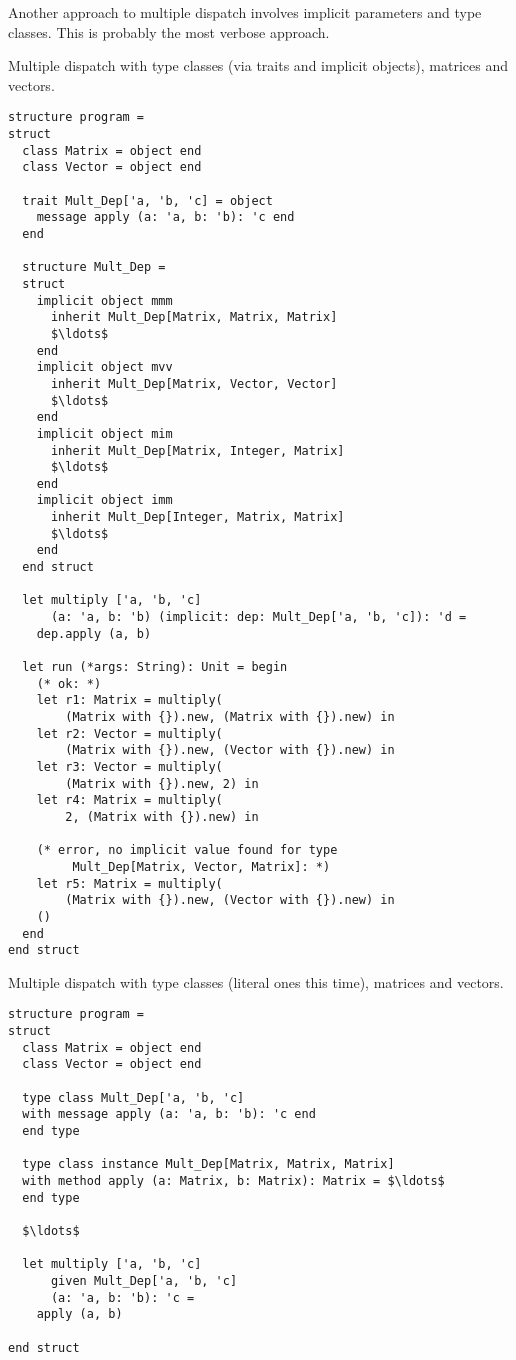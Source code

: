 Another approach to multiple dispatch involves implicit parameters and type classes. This is probably the most verbose approach. 

\example Multiple dispatch with type classes (via traits and implicit objects), matrices and vectors. 
\begin{lstlisting}
structure program =
struct
  class Matrix = object end
  class Vector = object end
  
  trait Mult_Dep['a, 'b, 'c] = object
    message apply (a: 'a, b: 'b): 'c end
  end
  
  structure Mult_Dep =
  struct
    implicit object mmm 
      inherit Mult_Dep[Matrix, Matrix, Matrix] 
      $\ldots$
    end
    implicit object mvv 
      inherit Mult_Dep[Matrix, Vector, Vector] 
      $\ldots$
    end
    implicit object mim 
      inherit Mult_Dep[Matrix, Integer, Matrix] 
      $\ldots$
    end
    implicit object imm 
      inherit Mult_Dep[Integer, Matrix, Matrix] 
      $\ldots$
    end
  end struct
  
  let multiply ['a, 'b, 'c]
      (a: 'a, b: 'b) (implicit: dep: Mult_Dep['a, 'b, 'c]): 'd =
    dep.apply (a, b)
  
  let run (*args: String): Unit = begin
    (* ok: *)
    let r1: Matrix = multiply(
        (Matrix with {}).new, (Matrix with {}).new) in
    let r2: Vector = multiply(
        (Matrix with {}).new, (Vector with {}).new) in
    let r3: Vector = multiply(
        (Matrix with {}).new, 2) in
    let r4: Matrix = multiply(
        2, (Matrix with {}).new) in
    
    (* error, no implicit value found for type
         Mult_Dep[Matrix, Vector, Matrix]: *)
    let r5: Matrix = multiply(
        (Matrix with {}).new, (Vector with {}).new) in
    ()
  end
end struct
\end{lstlisting}

\example Multiple dispatch with type classes (literal ones this time), matrices and vectors. 
\begin{lstlisting}
structure program = 
struct
  class Matrix = object end
  class Vector = object end
  
  type class Mult_Dep['a, 'b, 'c] 
  with message apply (a: 'a, b: 'b): 'c end
  end type
  
  type class instance Mult_Dep[Matrix, Matrix, Matrix]
  with method apply (a: Matrix, b: Matrix): Matrix = $\ldots$
  end type 
  
  $\ldots$
  
  let multiply ['a, 'b, 'c] 
      given Mult_Dep['a, 'b, 'c] 
      (a: 'a, b: 'b): 'c =
    apply (a, b)

end struct
\end{lstlisting}





